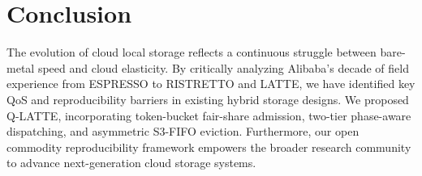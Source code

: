 \documentclass[10pt,twocolumn]{article}
\begin{document}
\section{Conclusion}
The evolution of cloud local storage reflects a continuous struggle between bare-metal speed and cloud elasticity. By critically analyzing Alibaba's decade of field experience from ESPRESSO to RISTRETTO and LATTE, we have identified key QoS and reproducibility barriers in existing hybrid storage designs. We proposed Q-LATTE, incorporating token-bucket fair-share admission, two-tier phase-aware dispatching, and asymmetric S3-FIFO eviction. Furthermore, our open commodity reproducibility framework empowers the broader research community to advance next-generation cloud storage systems.



\end{document}
